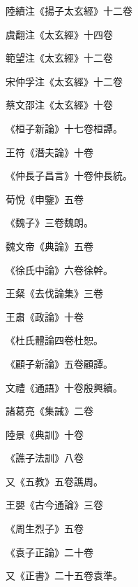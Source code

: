 \begin{pinyinscope}
 陸績注《揚子太玄經》十二卷



 虞翻注《太玄經》十四卷



 範望注《太玄經》十二卷



 宋仲孚注《太玄經》十二卷



 蔡文邵注《太玄經》十卷



 《桓子新論》十七卷桓譚。



 王符《潛夫論》十卷



 《仲長子昌言》十卷仲長統。



 荀悅《申鑒》五卷



 《魏子》三卷魏朗。



 魏文帝《典論》五卷



 《徐氏中論》六卷徐幹。



 王粲《去伐論集》三卷



 王肅《政論》十卷



 《杜氏體論四卷杜恕。



 《顧子新論》五卷顧譚。



 文禮《通語》十卷殷興續。



 諸葛亮《集誡》二卷



 陸景《典訓》十卷



 《譙子法訓》八卷



 又《五教》五卷譙周。



 王嬰《古今通論》三卷



 《周生烈子》五卷



 《袁子正論》二十卷



 又《正書》二十五卷袁準。




\end{pinyinscope}
